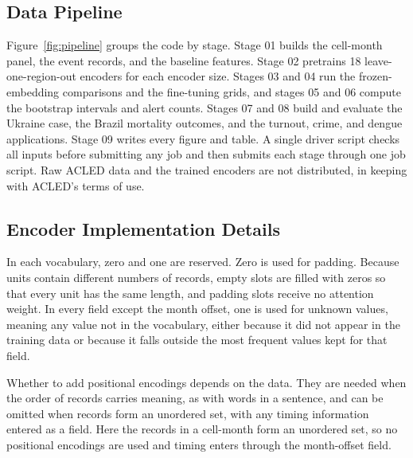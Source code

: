 \documentclass[11pt, letterpaper]{article}
\begin{document}
\subsection{Data Pipeline}
Figure~\ref{fig:pipeline} groups the code by stage. Stage 01 builds the cell-month panel, the event records, and the baseline features. Stage 02 pretrains 18 leave-one-region-out encoders for each encoder size. Stages 03 and 04 run the frozen-embedding comparisons and the fine-tuning grids, and stages 05 and 06 compute the bootstrap intervals and alert counts. Stages 07 and 08 build and evaluate the Ukraine case, the Brazil mortality outcomes, and the turnout, crime, and dengue applications. Stage 09 writes every figure and table. A single driver script checks all inputs before submitting any job and then submits each stage through one job script. Raw ACLED data and the trained encoders are not distributed, in keeping with ACLED's terms of use.



\subsection{Encoder Implementation Details}
\label{app:encoder_details}
In each vocabulary, zero and one are reserved. Zero is used for padding. Because units contain different numbers of records, empty slots are filled with zeros so that every unit has the same length, and padding slots receive no attention weight. %
In every field except the month offset, one is used for unknown values, meaning any value not in the vocabulary, either because it did not appear in the training data or because it falls outside the most frequent values kept for that field.

Whether to add positional encodings depends on the data. They are needed when the order of records carries meaning, as with words in a sentence, and can be omitted when records form an unordered set, with any timing information entered as a field. Here the records in a cell-month form an unordered set, so no positional encodings are used and timing enters through the month-offset field.
\end{document}
